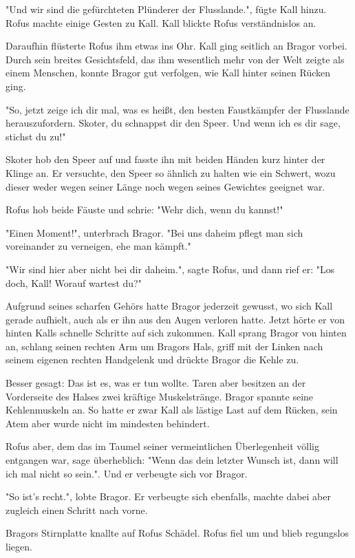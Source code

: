 \documentclass[10pt, a4paper, oneside]{book}
\begin{document}
\begin{multicols}{2}
"Und wir sind die gefürchteten Plünderer der Flusslande.", fügte Kall hinzu. Rofus machte einige Gesten zu Kall. Kall blickte Rofus verständnislos an. 

Daraufhin flüsterte Rofus ihm etwas ins Ohr. Kall ging seitlich an Bragor vorbei. Durch sein breites Gesichtsfeld, das ihm wesentlich mehr von der Welt zeigte als einem Menschen, konnte Bragor gut verfolgen, wie Kall hinter seinen Rücken ging. 

"So, jetzt zeige ich dir mal, was es heißt, den besten Faustkämpfer der Flusslande herauszufordern. Skoter, du schnappst dir den Speer. Und wenn ich es dir sage, stichst du zu!" 

Skoter hob den Speer auf und fasste ihn mit beiden Händen kurz hinter der Klinge an. Er versuchte, den Speer so ähnlich zu halten wie ein Schwert, wozu dieser weder wegen seiner Länge noch wegen seines Gewichtes geeignet war. 

Rofus hob beide Fäuste und schrie: "Wehr dich, wenn du kannst!" 

"Einen Moment!", unterbrach Bragor. "Bei uns daheim pflegt man sich voreinander zu verneigen, ehe man kämpft." 

"Wir sind hier aber nicht bei dir daheim.", sagte Rofus, und dann rief er: "Los doch, Kall! Worauf wartest du?" 

Aufgrund seines scharfen Gehörs hatte Bragor jederzeit gewusst, wo sich Kall gerade aufhielt, auch als er ihn aus den Augen verloren hatte. Jetzt hörte er von hinten Kalls schnelle Schritte auf sich zukommen. Kall sprang Bragor von hinten an, schlang seinen rechten Arm um Bragors Hals, griff mit der Linken nach seinem eigenen rechten Handgelenk und drückte Bragor die Kehle zu. 

Besser gesagt: Das ist es, was er tun wollte. Taren aber besitzen an der Vorderseite des Halses zwei kräftige Muskelstränge. Bragor spannte seine Kehlenmuskeln an. So hatte er zwar Kall als lästige Last auf dem Rücken, sein Atem aber wurde nicht im mindesten behindert. 

Rofus aber, dem das im Taumel seiner vermeintlichen Überlegenheit völlig entgangen war, sage überheblich: "Wenn das dein letzter Wunsch ist, dann will ich mal nicht so sein.". Und er verbeugte sich vor Bragor. 

"So ist’s recht.", lobte Bragor. Er verbeugte sich ebenfalls, machte dabei aber zugleich einen Schritt nach vorne. 

Bragors Stirnplatte knallte auf Rofus Schädel. Rofus fiel um und blieb regungslos liegen. 


\end{multicols}
\end{document}
